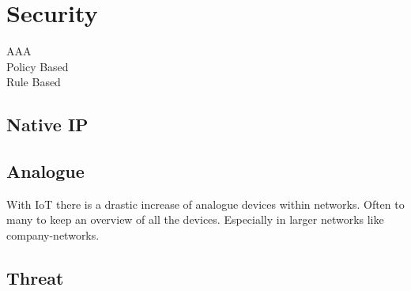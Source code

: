 \chapter{Security}
AAA \\
Policy Based \\
Rule Based
\section{Native IP}

\section{Analogue}
With IoT there is a drastic increase of analogue devices within networks. Often to many to keep an overview of all the devices. Especially in larger networks like company-networks. 
\section{Threat}


